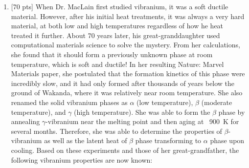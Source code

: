\begin{enumerate}
  \item {[70 pts]} When Dr. MacLain first studied vibranium, it was a soft
    ductile material. However, after his
    initial heat treatments, it was always a very hard material, at
    both low and high temperatures regardless
    of how he heat treated it further. About 70 years later, his
    great-granddaughter used computational
    materials science to solve the mystery. From her calculations,
    she found that it should form a previously
    unknown phase at room temperature, which is soft and ductile! In
    her resulting Nature: Marvel
    Materials paper, she postulated that the formation kinetics of
    this phase were incredibly slow, and it
    had only formed after thousands of years below the ground of
    Wakanda, where it was relatively near
    room temperature. She also renamed the solid vibranium phases as
    $\alpha$ (low temperature), $\beta$ (moderate
    temperature), and $\gamma$ (high temperature). She was able to form the
    $\beta$ phase by annealing $\gamma$-vibranium
    near the melting point and then aging at ~\SI{900}{\kelvin} for several
    months. Therefore, she was able to
    determine the properties of $\beta$-vibranium as well as the latent
    heat of $\beta$ phase transforming to $\alpha$ phase
    upon cooling. Based on these experiments and those of her
    great-grandfather, the following vibranium
    properties are now known:


\end{enumerate}
